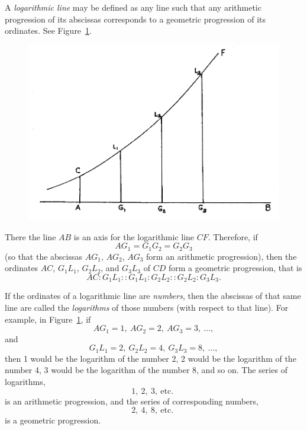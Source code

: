 \documentclass[polutonikogreek,english,twoside,openright]{article}
\begin{document}
A {\em logarithmic line}\label{logdef} may be defined as any line
such that any arithmetic progression of its abscissas corresponds to a
geometric progression of its ordinates.  See Figure~\ref{logs}.
\begin{figure}[htp]
\begin{center}
\includegraphics[width=\textwidth]{fig/Figure27A}
\caption{}
\label{logs}
\vspace{-10pt}
\end{center}
\end{figure}
  There the line $AB$ is an axis for the logarithmic line $CF$.  Therefore, if 
$$AG_1 = G_1G_2 = G_2G_3$$
(so that the abscissas $AG_1$, $AG_2$, $AG_3$ form an arithmetic progression),
 then the ordinates $AC$, $G_1L_1$, $G_2L_2$, and $G_3L_3$ of $CD$ form a geometric progression, that is
$$AC\!:\! G_1L_1 :: G_1L_1 \!:\! G_2L_2 :: G_2L_2 \!:\! G_3L_3.$$

If the ordinates of a logarithmic line are {\em numbers}, then the
abscissas of that same line are called the {\em logarithms} of those
numbers (with respect to that line).  For example, in
Figure~\ref{logs}, if
$$AG_1 = 1,\ AG_2 = 2,\ AG_3 = 3,\ \ldots,$$
and
$$G_1L_1 = 2,\ G_2L_2 = 4,\ G_3L_3 = 8,\ \ldots,$$
then 1 would be the logarithm of the number 2, 2 would be the
logarithm of the number 4, 3 would be the logarithm of the number 8,
and so on.  The series of logarithms,
$$1,\ 2,\ 3,\ \mbox{etc. }$$
is an arithmetic progression, and the series of corresponding numbers,
$$2,\ 4,\ 8,\ \mbox{etc. }$$
is a geometric progression.
\end{document}
